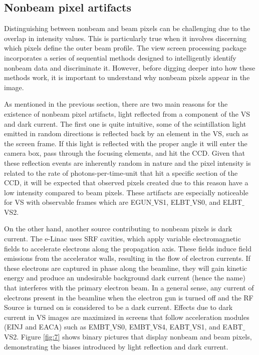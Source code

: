 \documentclass{article}
\begin{document}
\subsection{Nonbeam pixel artifacts}
    
Distinguishing between nonbeam and beam pixels can be challenging due to the overlap in intensity values. This is particularly true when it involves discerning which pixels define the outer beam profile. The view screen processing package incorporates a series of sequential methods designed to intelligently identify nonbeam data and discriminate it. However, before digging deeper into how these methods work, it is important to understand why nonbeam pixels appear in the image. 
    
As mentioned in the previous section, there are two main reasons for the existence of nonbeam pixel artifacts, light reflected from a component of the VS and dark current. The first one is quite intuitive, some of the scintillation light emitted in random directions is reflected back by an element in the VS, such as the screen frame. If this light is reflected with the proper angle it will enter the camera box, pass through the focusing elements, and hit the CCD. Given that these reflection events are inherently random in nature and the pixel intensity is related to the rate of photons-per-time-unit that hit a specific section of the CCD, it will be expected that observed pixels created due to this reason have a low intensity compared to beam pixels. These artifacts are especially noticeable for VS with observable frames which are EGUN$\_$VS1, ELBT$\_$VS0, and ELBT$\_$VS2.

On the other hand, another source contributing to nonbeam pixels is dark current. The e-Linac uses SRF cavities, which apply variable electromagnetic fields to accelerate electrons along the propagation axis. These fields induce field emissions from the accelerator walls, resulting in the flow of electron currents. If these electrons are captured in phase along the beamline, they will gain kinetic energy and produce an undesirable background dark current (hence the name) that interferes with the primary electron beam. In a general sense, any current of electrons present in the beamline when the electron gun is turned off and the RF Source is turned on is considered to be a dark current. Effects due to dark current in VS images are maximized in screens that follow acceleration modules (EINJ and EACA) such as EMBT$\_$VS0, EMBT$\_$VS4, EABT$\_$VS1, and EABT$\_$VS2. Figure \ref{fig:7} shows binary pictures that display nonbeam and beam pixels, demonstrating the biases introduced by light reflection and dark current.  
\end{document}
